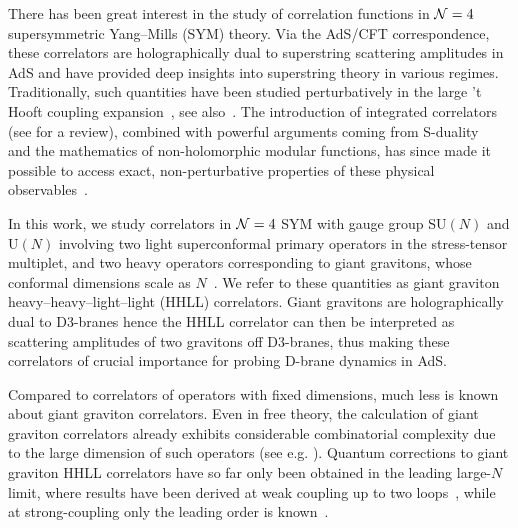\documentclass[aps,prl,twocolumn, longbibliography,footinbib,superscriptaddress, preprintnumbers]{revtex4-1}
\newcommand{\<}{\langle}
\renewcommand{\>}{\rangle}
\def\cN{{\cal N}}
\begin{document}
There has been great interest in the study of correlation functions in $\cN=4$ supersymmetric Yang–Mills (SYM) theory. Via the AdS/CFT correspondence, these correlators are holographically dual to superstring scattering amplitudes in AdS and have provided deep insights into superstring theory in various regimes. Traditionally, such quantities have been studied perturbatively in the large ’t Hooft coupling expansion~\cite{Freedman:1998tz, Rastelli:2016nze, Aprile:2017bgs, Caron-Huot:2018kta,  Alday:2019nin, Alday:2023mvu, Aprile:2024lwy, Wang:2025pjo}, see also~\cite{Heslop:2022xgp, Bissi:2022mrs}. The introduction of integrated correlators~\cite{Binder:2019jwn, Chester:2020dja} (see \cite{Dorigoni:2022iem} for a review), combined with powerful arguments coming from S-duality~\cite{Chester:2019jas, Chester:2020vyz, Dorigoni:2021guq, Dorigoni:2021bvj, Alday:2023pet} and the mathematics of non-holomorphic modular functions, has since made it possible to access exact, non-perturbative properties of these physical observables~\cite{Chester:2019jas, Chester:2020vyz, Chester:2021aun, Caron-Huot:2024tzr, Dempsey:2025yiv}.

In this work, we study correlators in $\cN=4$ SYM with gauge group SU$(N)$ and U$(N)$ involving two light superconformal primary operators in the stress-tensor multiplet, and two heavy operators corresponding to giant gravitons, whose conformal dimensions scale as $N$~\cite{McGreevy:2000cw,Hashimoto:2000zp, Balasubramanian:2001nh, Corley:2001zk}. We refer to these quantities as giant graviton heavy–heavy–light–light (HHLL) correlators. Giant gravitons are holographically dual to D3-branes hence the HHLL correlator can then be interpreted as scattering amplitudes of two gravitons off D3-branes, thus making these correlators of crucial importance for probing D-brane dynamics in AdS.


 Compared to correlators of operators with fixed  dimensions, much less is known about giant graviton correlators. Even in free theory, the calculation of giant graviton correlators already exhibits considerable combinatorial complexity due to the large dimension of such operators (see e.g. \cite{Corley:2001zk, deMelloKoch:2004crq,Kimura:2007wy,Bissi:2011dc,Jiang:2019xdz,Jiang:2019zig, Holguin:2022zii}). Quantum corrections to giant graviton HHLL correlators have so far only been obtained in the leading large-$N$ limit, where results have been derived at weak coupling up to two loops~\cite{Jiang:2019xdz, Wu:2025ott, Jiang:2023uut}, while at strong-coupling only the leading order is known~\cite{Chen:2025yxg, Chen:2026ium}.
\end{document}
